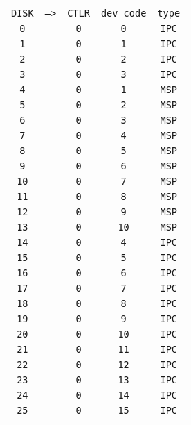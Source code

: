 \begin{adjustwidth}{5ex}{1ex}
	\begin{tabular}{ccccc}
        \texttt{DISK} & \texttt{-->} & \texttt{CTLR}  & \texttt{dev\_code} & \texttt{type} \\
		\texttt{0} & & \texttt{0} &  \texttt{0} & \texttt{IPC} \\
		\texttt{1} & & \texttt{0} &  \texttt{1} & \texttt{IPC} \\
		\texttt{2} & & \texttt{0} &  \texttt{2} & \texttt{IPC} \\
		\texttt{3} & & \texttt{0} &  \texttt{3} & \texttt{IPC} \\
		\texttt{4} & & \texttt{0} &  \texttt{1} & \texttt{MSP} \\
		\texttt{5} & & \texttt{0} &  \texttt{2} & \texttt{MSP} \\
		\texttt{6} & & \texttt{0} &  \texttt{3} & \texttt{MSP} \\
		\texttt{7} & & \texttt{0} &  \texttt{4} & \texttt{MSP} \\
		\texttt{8} & & \texttt{0} &  \texttt{5} & \texttt{MSP} \\
		\texttt{9} & & \texttt{0} &  \texttt{6} & \texttt{MSP} \\
		\texttt{10} & & \texttt{0} &  \texttt{7} & \texttt{MSP} \\
		\texttt{11} & & \texttt{0} &  \texttt{8} & \texttt{MSP} \\
		\texttt{12} & & \texttt{0} &  \texttt{9} & \texttt{MSP} \\
		\texttt{13} & & \texttt{0} &  \texttt{10} & \texttt{MSP} \\
		\texttt{14} & & \texttt{0} &  \texttt{4} & \texttt{IPC} \\
		\texttt{15} & & \texttt{0} &  \texttt{5} & \texttt{IPC} \\
		\texttt{16} & & \texttt{0} &  \texttt{6} & \texttt{IPC} \\
		\texttt{17} & & \texttt{0} &  \texttt{7} & \texttt{IPC} \\
		\texttt{18} & & \texttt{0} &  \texttt{8} & \texttt{IPC} \\
		\texttt{19} & & \texttt{0} &  \texttt{9} & \texttt{IPC} \\
		\texttt{20} & & \texttt{0} &  \texttt{10} & \texttt{IPC} \\
		\texttt{21} & & \texttt{0} &  \texttt{11} & \texttt{IPC} \\
		\texttt{22} & & \texttt{0} &  \texttt{12} & \texttt{IPC} \\
		\texttt{23} & & \texttt{0} &  \texttt{13} & \texttt{IPC} \\
		\texttt{24} & & \texttt{0} &  \texttt{14} & \texttt{IPC} \\
		\texttt{25} & & \texttt{0} &  \texttt{15} & \texttt{IPC} \\
    \end{tabular}
\end{adjustwidth}
